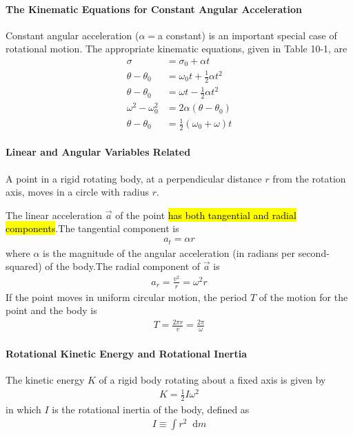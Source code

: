\documentclass{article}
\newcommand*\diff{\mathop{}\!\mathrm{d}}
\numberwithin{equation}{subsection} %
\theoremstyle{definition}
\begin{document}
\paragraph{The Kinematic Equations for Constant Angular Acceleration}
Constant angular acceleration ($\alpha =$a constant) is an important
special case of rotational motion. The appropriate kinematic
equations, given in Table 10-1, are
\begin{align}
    \sigma &= \sigma_0 + \alpha t \\
    \theta - \theta_0 &= \omega_0 t + \frac{1}{2} \alpha t^2 \\
    \theta - \theta_0 &= \omega t - \frac{1}{2} \alpha t^2 \\
    \omega^2 - \omega_0^2 &= 2\alpha (\theta - \theta_0) \\
    \theta - \theta_0 &= \frac{1}{2}(\omega_0 + \omega) t
\end{align}

\paragraph{Linear and Angular Variables Related} A point in a rigid
rotating body, at a perpendicular distance $r$ from the rotation axis,
moves in a circle with radius $r$. 

The linear acceleration $\vec{a}$ of the point \hl{has both tangential and
radial components}.The tangential component is
\begin{align}
    a_t = \alpha r
\end{align}
where $\alpha$ is the magnitude of the angular acceleration (in radians
per second-squared) of the body.The radial component of $\vec{a}$ is
\begin{align}
    a_r = \frac{v^2}{r} = \omega^2 r
\end{align}
If the point moves in uniform circular motion, the period $T$ of
the motion for the point and the body is
\begin{align}
    T = \frac{2\pi r}{v} = \frac{2\pi}{\omega}
\end{align}
\paragraph{Rotational Kinetic Energy and Rotational Inertia} The
kinetic energy $K$ of a rigid body rotating about a fixed axis is
given by
\begin{align}
    K=\frac{1}{2} I\omega^2
\end{align}
in which $I$ is the rotational inertia of the body, defined as
\begin{align}
    I \equiv \int r^2 \diff m
\end{align}
\end{document}
